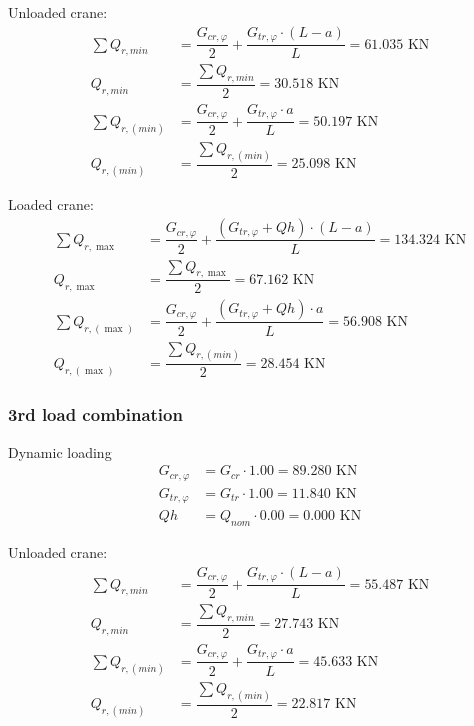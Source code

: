 \documentclass[a4paper,10pt, final, oneside, fleqn, onecolumn]{article}	%
\begin{document}
Unloaded crane:
\begin{align*}
    \sum{Q_{r,min}}   &= \dfrac{G_{cr,φ}}{2} + \dfrac{G_{tr,φ} \cdot (L - a)}{L} = 61.035 \text{ KN} \\
    Q_{r,min}         &= \dfrac{\displaystyle\sum{Q_{r,min}}}{2}                 = 30.518  \text{ KN} \\
    \sum{Q_{r,(min)}} &= \dfrac{G_{cr,φ}}{2} + \dfrac{G_{tr,φ} \cdot a}{L}       = 50.197 \text{ KN} \\
    Q_{r,(min)}       &= \dfrac{\displaystyle\sum{Q_{r,(min)}}}{2}               = 25.098  \text{ KN}
\end{align*}

Loaded crane:
\begin{align*}
    \sum{Q_{r,\max}}     &= \dfrac{G_{cr,φ}}{2} + \dfrac{(G_{tr,φ} + Qh) \cdot (L - a)}{L} = 134.324 \text{ KN} \\
    Q_{r,\max}           &= \dfrac{\displaystyle\sum{Q_{r,\max}}}{2}                       = 67.162  \text{ KN} \\
    \sum{Q_{r,(\max)}}   &= \dfrac{G_{cr,φ}}{2} + \dfrac{(G_{tr,φ} + Qh) \cdot a}{L}       = 56.908 \text{ KN} \\
    Q_{r,(\max)}         &= \dfrac{\displaystyle\sum{Q_{r,(min)}}}{2}                      = 28.454 \text{ KN}
\end{align*}

\subsubsection{3rd load combination}

Dynamic loading
\begin{align*}
    G_{cr,φ} &= G_{cr} \cdot 1.00  = 89.280 \text{ KN} \\
    G_{tr,φ} &= G_{tr} \cdot 1.00  = 11.840 \text{ KN} \\
    Qh       &= Q_{nom} \cdot 0.00 = 0.000   \text{ KN}
\end{align*}

Unloaded crane:
\begin{align*}
    \sum{Q_{r,min}}   &= \dfrac{G_{cr,φ}}{2} + \dfrac{G_{tr,φ} \cdot (L - a)}{L} = 55.487 \text{ KN} \\
    Q_{r,min}         &= \dfrac{\displaystyle\sum{Q_{r,min}}}{2}                 = 27.743  \text{ KN} \\
    \sum{Q_{r,(min)}} &= \dfrac{G_{cr,φ}}{2} + \dfrac{G_{tr,φ} \cdot a}{L}       = 45.633 \text{ KN} \\
    Q_{r,(min)}       &= \dfrac{\displaystyle\sum{Q_{r,(min)}}}{2}               = 22.817  \text{ KN}
\end{align*}
\end{document}
